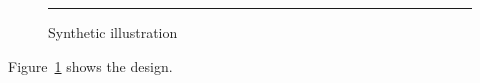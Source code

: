 \documentclass{article}
\begin{document}

\begin{figure}
\centering\rule{1cm}{1cm}
\caption{Synthetic illustration}\label{fig:design}
\end{figure}
Figure~\ref{fig:design} shows the design.


\end{document}
